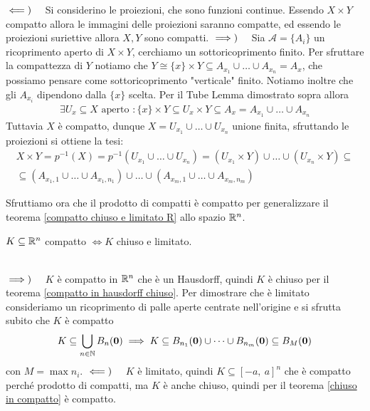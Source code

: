 \begin{demonstration}
	$\impliedby)\quad $ Si considerino le proiezioni, che sono funzioni continue. Essendo $X\times Y$ compatto allora le immagini delle proiezioni saranno compatte, ed essendo le proiezioni suriettive allora $X,Y$ sono compatti. \newline
	$\implies)\quad $ Sia $\mathcal{A}=\{A_i\}$ un ricoprimento aperto di $X\times Y$, cerchiamo un sottoricoprimento finito.\newline
	Per sfruttare la compattezza di $Y$ notiamo che $Y\cong \{x\}\times Y\subseteq A_{x_1}\cup\dots\cup A_{x_n}=A_x$, che possiamo pensare come sottoricoprimento "verticale" finito. Notiamo inoltre che gli $A_{x_i}$ dipendono dalla $\{x\}$ scelta.\newline
	Per il Tube Lemma dimostrato sopra allora 
		\begin{gather*}
			\exists U_x\subseteq X \text{ aperto }\colon \{ x\}\times Y \subseteq U_x\times Y \subseteq A_x=A_{x_1}\cup\dots\cup A_{x_n}
		\end{gather*}
	Tuttavia $X$ è compatto, dunque $X=U_{x_1}\cup\dots\cup U_{x_n}$ unione finita, sfruttando le proiezioni si ottiene la tesi:
		\begin{gather*}
			X\times Y =p^{-1}(X)=p^{-1}\left( U_{x_1}\cup\dots\cup U_{x_n}\right)= (U_{x_1}\times Y)\cup\dots\cup (U_{x_n}\times Y)\subseteq \\
			\subseteq \left( A_{x_1 , 1}\cup\dots\cup A_{x_1, n_1}\right) \cup\dots\cup \left( A_{x_m, 1}\cup\dots\cup A_{x_m, n_m} \right)
		\end{gather*}
\end{demonstration}

Sfruttiamo ora che il prodotto di compatti è compatto per generalizzare il teorema \ref{compatto chiuso e limitato R} allo spazio $\mathbb{R} ^n$.
\begin{theorema}
	$K\subseteq \mathbb{R}^n$ compatto $\iff K$ chiuso e limitato.
\end{theorema}
\begin{demonstration} ~{} \\
	$\implies)\quad$ $K$ è compatto in $\mathbb{R}^n$ che è un Hausdorff, quindi $K$ è chiuso per il teorema \ref{compatto in hausdorff chiuso}. Per dimostrare che è limitato  consideriamo un ricoprimento di palle aperte centrate nell'origine e si sfrutta subito che $K$ è compatto
		\begin{gather*}
			K\subseteq \mathop{{\bigcup}}\displaylimits_{n\in\mathbb{N}} B_n(\mathbf{0}) \implies K\subseteq B_{n_1}(\mathbf{0})\cup\dots\cup B_{n_m}(\mathbf{0}) \subseteq B_M (\mathbf{0})
		\end{gather*}
	con $M=\max n_i$.\newline
	$\impliedby)\quad$ $K$ è limitato, quindi $K\subseteq [-a,\ a]^n$ che è compatto perché prodotto di compatti, ma $K$ è anche chiuso, quindi per il teorema \ref{chiuso in compatto} è compatto.
\end{demonstration}


